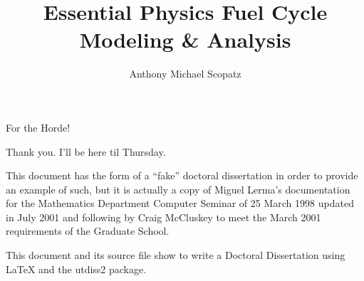\documentclass[12pt]{report}    %
\author{Anthony Michael Scopatz}    %
\title{Essential Physics Fuel Cycle Modeling \& Analysis}    %
\theoremstyle{definition}
\theoremstyle{remark}
\begin{document}
\copyrightpage  %


%
%
%
\commcertpage   %

\titlepage      %



%
\begin{dedication}
%
For the Horde!
\end{dedication}


\begin{acknowledgments}		%
%
Thank you.  I'll be here til Thursday.
\end{acknowledgments}


%
\utabstract
{}%
\indent
This document has the form of a ``fake'' doctoral dissertation
in order to provide an example of such, but it is actually a
copy of Miguel Lerma's documentation for the Mathematics
Department Computer Seminar of 25 March 1998 updated in July 2001
and following by Craig McCluskey to meet the March 2001
requirements of the Graduate School.

This document and its source file show to write a Doctoral Dissertation using 
\LaTeX{} and the utdiss2 package. 



\tableofcontents   %

\listoftables      %
\listoffigures     %
\end{document}

